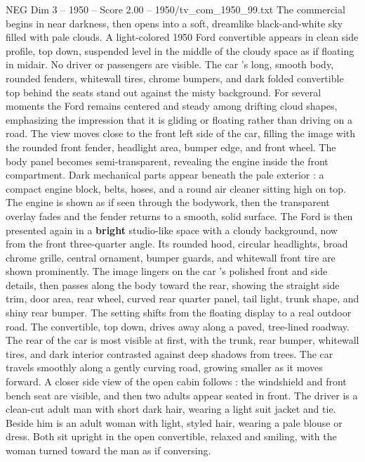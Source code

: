 \begin{textsample}{NEG Dim 3 – 1950 – Score 2.00 – 1950/tv\_com\_1950\_99.txt}  \label{ex:f3_neg_090}
The commercial begins in near darkness, then opens into a soft, dreamlike black-and-white sky filled with pale clouds.
A light-colored 1950 Ford convertible appears in clean side profile, top down, suspended level in the middle of the cloudy space as if floating in midair.
No driver or passengers are visible.
The car ’s long, smooth body, rounded fenders, whitewall tires, chrome bumpers, and dark folded convertible top behind the seats stand out against the misty background.
For several moments the Ford remains centered and steady among drifting cloud shapes, emphasizing the impression that it is gliding or floating rather than driving on a road.
The view moves close to the front left side of the car, filling the image with the rounded front fender, headlight area, bumper edge, and front wheel.
The body panel becomes semi-transparent, revealing the engine inside the front compartment.
Dark mechanical parts appear beneath the pale exterior : a compact engine block, belts, hoses, and a round air cleaner sitting high on top.
The engine is shown as if seen through the bodywork, then the transparent overlay fades and the fender returns to a smooth, solid surface.
The Ford is then presented again in a \textbf{bright} studio-like space with a cloudy background, now from the front three-quarter angle.
Its rounded hood, circular headlights, broad chrome grille, central ornament, bumper guards, and whitewall front tire are shown prominently.
The image lingers on the car ’s polished front and side details, then passes along the body toward the rear, showing the straight side trim, door area, rear wheel, curved rear quarter panel, tail light, trunk shape, and shiny rear bumper.
The setting shifts from the floating display to a real outdoor road.
The convertible, top down, drives away along a paved, tree-lined roadway.
The rear of the car is most visible at first, with the trunk, rear bumper, whitewall tires, and dark interior contrasted against deep shadows from trees.
The car travels smoothly along a gently curving road, growing smaller as it moves forward.
A closer side view of the open cabin follows : the windshield and front bench seat are visible, and then two adults appear seated in front.
The driver is a clean-cut adult man with short dark hair, wearing a light suit jacket and tie.
Beside him is an adult woman with light, styled hair, wearing a pale blouse or dress.
Both sit upright in the open convertible, relaxed and smiling, with the woman turned toward the man as if conversing.

\end{textsample}
